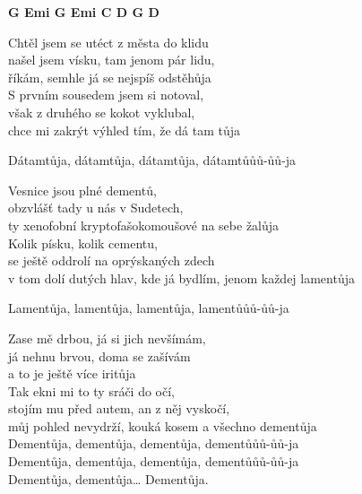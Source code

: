 
{\footnotesize\textbf{G Emi G Emi C D G D}}

\ve{}
Chtěl jsem se utéct z města do klidu\\
našel jsem vísku, tam jenom pár lidu,\\
říkám, semhle já se nejspíš odstěhůja \\
S prvním sousedem jsem si notoval,\\
však z druhého se kokot vyklubal,\\
chce mi zakrýt výhled tím, že dá tam tůja

\ve{}
Dátamtůja, dátamtůja, dátamtůja, dátamtůůů-ůů-ja 

\ve{}
Vesnice jsou plné dementů,\\
obzvlášť tady u nás v Sudetech,\\
ty xenofobní kryptofašokomoušové na sebe žalůja \\
Kolik písku, kolik cementu, \\
se ještě oddrolí na oprýskaných zdech\\
v tom dolí dutých hlav, kde já bydlím, jenom každej lamentůja

\ve{}
Lamentůja, lamentůja, lamentůja, lamentůůů-ůů-ja 

\ve{}
Zase mě drbou, já si jich nevšímám,\\
já nehnu brvou, doma se zašívám\\
a to je ještě více iritůja \\
Tak ekni mi to ty sráči do očí, \\
stojím mu před autem, an z něj vyskočí,\\
můj pohled nevydrží, kouká kosem a všechno dementůja\\
Dementůja, dementůja, dementůja, dementůůů-ůů-ja\\
Dementůja, dementůja, dementůja, dementůůů-ůů-ja \\
Dementůja, dementůja… Dementůja.

\esong{}
